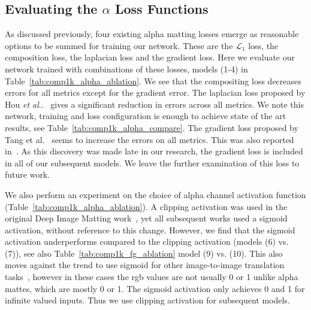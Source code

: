 \documentclass[runningheads]{llncs}
\makeatletter
\DeclareRobustCommand\onedot{\futurelet\@let@token\@onedot}
\def\@onedot{\ifx\@let@token.\else.\null\fi\xspace}
\def\etal{\emph{et al}\onedot}
\makeatother
\begin{document}
\subsection{Evaluating the $\alpha$ Loss Functions}
As discussed previously, four existing alpha matting losses emerge as reasonable options to be summed for training our network. These are the $\mathcal{L}_1$ loss, the composition loss, the laplacian loss and the gradient loss. Here we evaluate our network trained with combinations of these losses, models (1-4) in Table~\ref{tab:comp1k_alpha_ablation}. We see that the compositing loss decreases errors for all metrics except for the gradient error. The laplacian loss proposed by Hou \etal~\cite{ContextMatting} gives a significant reduction in errors across all metrics. We note this network, training and loss configuration is enough to achieve state of the art results, see Table~\ref{tab:comp1k_alpha_compare}. The gradient loss proposed by Tang et al.~\cite{LearningBasedSamplingMatting} seems to increase the errors on all metrics. This was also reported in~\cite{GCAMatting}. As this discovery was made late in our research, the gradient loss is included in all of our subsequent models. We leave the further examination of this loss to future work. 

We also perform an experiment on the choice of alpha channel activation function (Table~\ref{tab:comp1k_alpha_ablation}). A clipping activation was used in the original Deep Image Matting work~\cite{DeepImageMatting}, yet all subsequent works used a sigmoid activation, without reference to this change. However, we find that the sigmoid activation underperforms compared to the clipping activation (models (6) vs. (7)), see also Table~\ref{tab:comp1k_fg_ablation} model (9) vs. (10). This also moves against the trend to use sigmoid for other image-to-image translation tasks~\cite{pix2pix,gatedinpainting}, however in these cases the rgb values are not usually 0 or 1 unlike alpha mattes, which are mostly 0 or 1. The sigmoid activation only achieves 0 and 1 for infinite valued inputs. Thus we use clipping activation for subsequent models.  
\end{document}
